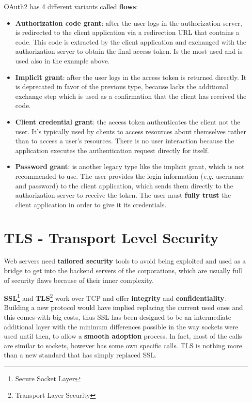 \documentclass[oneside]{academica}
\begin{document}
OAuth2 has 4 different variants called \textbf{flows}:
\begin{itemize}
  \item \textbf{Authorization code grant}: after the user logs in the authorization server, is redirected to the client application via a redirection URL that contains a code. This code is extracted by the client application and exchanged with the authorization server to obtain the final access token. Is the most used and is used also in the example above.
  \item \textbf{Implicit grant}: after the user logs in the access token is returned directly. It is deprecated in favor of the previous type, because lacks the additional exchange step which is used as a confirmation that the client has received the code.
  \item \textbf{Client credential grant}: the access token authenticates the client not the user. It's typically used by clients to access resources about themselves rather than to access a user's resources. There is no user interaction because the application executes the authentication request directly for itself.
  \item \textbf{Password grant}: is another legacy type like the implicit grant, which is not recommended to use. The user provides the login information (\textit{e.g.} username and password) to the client application, which sends them directly to the authorization server to receive the token. The user must \textbf{fully trust} the client application in order to give it its credentials.
\end{itemize}

\chapter{TLS - Transport Level Security}

Web servers need \textbf{tailored security} tools to avoid being exploited and used as a bridge to get into the backend servers of the corporations, which are usually full of security flaws because of their inner complexity.

\textbf{SSL}\footnote{Secure Socket Layer} and \textbf{TLS}\footnote{Transport Layer Security} work over TCP and offer \textbf{integrity} and \textbf{confidentiality}.
Building a new protocol would have implied replacing the current used ones and this comes with big costs, thus SSL has been designed to be an intermediate additional layer with the minimum differences possible in the way sockets were used until then, to allow a \textbf{smooth adoption} process.
In fact, most of the calls are similar to sockets, however has some own specific calls.
TLS is nothing more than a new standard that has simply replaced SSL.
\end{document}
